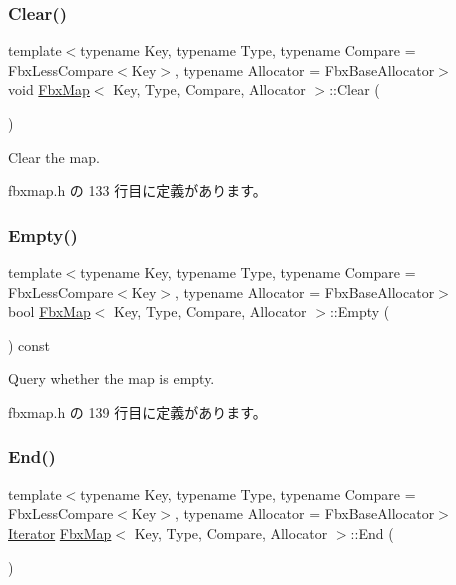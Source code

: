 \subsubsection{\texorpdfstring{Clear()}{Clear()}}
{\footnotesize\ttfamily template$<$typename Key, typename Type, typename Compare = Fbx\+Less\+Compare$<$\+Key$>$, typename Allocator = Fbx\+Base\+Allocator$>$ \\
void \hyperlink{class_fbx_map}{Fbx\+Map}$<$ Key, Type, Compare, Allocator $>$\+::Clear (\begin{DoxyParamCaption}{ }\end{DoxyParamCaption})\hspace{0.3cm}{\ttfamily [inline]}}



Clear the map. 



 fbxmap.\+h の 133 行目に定義があります。

\mbox{\label{class_fbx_map_a64fb934f6378b6d41b383bdcfa3b5b26}} 
\subsubsection{\texorpdfstring{Empty()}{Empty()}}
{\footnotesize\ttfamily template$<$typename Key, typename Type, typename Compare = Fbx\+Less\+Compare$<$\+Key$>$, typename Allocator = Fbx\+Base\+Allocator$>$ \\
bool \hyperlink{class_fbx_map}{Fbx\+Map}$<$ Key, Type, Compare, Allocator $>$\+::Empty (\begin{DoxyParamCaption}{ }\end{DoxyParamCaption}) const\hspace{0.3cm}{\ttfamily [inline]}}



Query whether the map is empty. 



 fbxmap.\+h の 139 行目に定義があります。

\mbox{\label{class_fbx_map_aaaef5f105428c380732482c46ad4b826}} 
\subsubsection{\texorpdfstring{End()}{End()}\hspace{0.1cm}{\footnotesize\ttfamily [1/2]}}
{\footnotesize\ttfamily template$<$typename Key, typename Type, typename Compare = Fbx\+Less\+Compare$<$\+Key$>$, typename Allocator = Fbx\+Base\+Allocator$>$ \\
\hyperlink{class_fbx_map_ab0989f3b30c0c8652ff9ee1b28b5c1af}{Iterator} \hyperlink{class_fbx_map}{Fbx\+Map}$<$ Key, Type, Compare, Allocator $>$\+::End (\begin{DoxyParamCaption}{ }\end{DoxyParamCaption})\hspace{0.3cm}{\ttfamily [inline]}}



